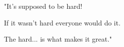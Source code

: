 \quote

"It's supposed to be hard!

If it wasn't hard everyone would do it.

The hard... is what makes it great."

\endquote